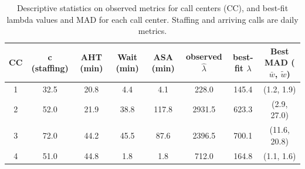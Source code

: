\documentclass[manuscript,screen,authorversion]{acmart}
\begin{document}


  \begin{table}[t!]
  \centering
    \caption{Descriptive statistics on observed metrics for call centers (CC), and
  best-fit lambda values and MAD for each call center. Staffing and arriving
  calls are daily metrics.}\label{tab:parameter-fitting}

  \small
  \setlength{\tabcolsep}{4pt}
  \begin{tabular}{@{}cccccccc@{}}
  \toprule
  CC & c (staffing) & AHT (min) & Wait (min) & ASA (min) & observed $
  \hat{\lambda}$ & best-fit $\lambda$ & Best MAD ($\bar{w}$, $\tilde{w}$) \\
  \midrule
  1 & 32.5 & 20.8 & 4.4 & 4.1 & 228.0 & 145.4 & (1.2, 1.9) \\
  2 & 52.0 & 21.9 & 38.8 & 117.8 & 2931.5 & 623.3 & (2.9, 27.0) \\
  3 & 72.0 & 44.2 & 45.5 & 87.6 & 2396.5 & 700.1 & (11.6, 20.8) \\
  4 & 51.0 & 44.8 & 1.8 & 1.8 & 712.0 & 164.8 & (1.1, 1.6) \\
  \bottomrule
  \end{tabular}

  \vspace{-0.1in}
  \end{table}
\end{document}
